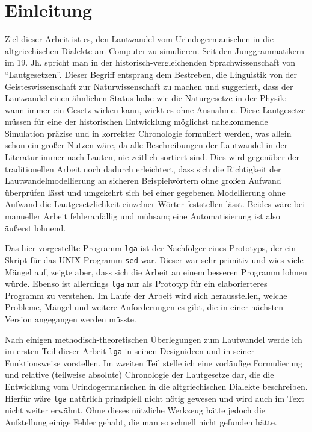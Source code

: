 \documentclass[12pt,a4paper,normalheadings,bibliography=totoc]{scrartcl}
\def\tt#1{\texttt{#1}}
\begin{document}
\newpage

\section{Einleitung}

Ziel dieser Arbeit ist es,
den Lautwandel vom Urindogermanischen in die altgriechischen Dialekte
am Computer zu simulieren.
Seit den Junggrammatikern im 19. Jh. spricht man
in der historisch-vergleichenden Sprachwissenschaft von ``Lautgesetzen''.
Dieser Begriff entsprang dem Bestreben,
die Linguistik von der Geisteswissenschaft zur Naturwissenschaft zu machen
und suggeriert, dass der Lautwandel
einen ähnlichen Status habe wie die Naturgesetze in der Physik:
wann immer ein Gesetz wirken kann, wirkt es ohne Ausnahme.
Diese Lautgesetze müssen für eine der historischen Entwicklung möglichst
nahekommende Simulation präzise und in korrekter Chronologie formuliert werden,
was allein schon ein großer Nutzen wäre,
da alle Beschreibungen der Lautwandel in der Literatur
immer nach Lauten, nie zeitlich sortiert sind.
Dies wird gegenüber der traditionellen Arbeit noch dadurch erleichtert,
dass sich die Richtigkeit der Lautwandelmodellierung
an sicheren Beispielwörtern ohne großen Aufwand überprüfen lässt
und umgekehrt sich bei einer gegebenen Modellierung
ohne Aufwand die Lautgesetzlichkeit einzelner Wörter feststellen lässt.
Beides wäre bei manueller Arbeit fehleranfällig und mühsam;
eine Automatisierung ist also äußerst lohnend.

Das hier vorgestellte Programm \tt{lga} ist
der Nachfolger eines Prototyps,
der ein Skript für das UNIX-Programm \tt{sed} war.
Dieser war sehr primitiv und wies viele Mängel auf,
zeigte aber,
dass sich die Arbeit an einem besseren Programm lohnen würde.
Ebenso ist allerdings \tt{lga} nur als Prototyp
für ein elaborierteres Programm zu verstehen.
Im Laufe der Arbeit wird sich herausstellen,
welche Probleme, Mängel und weitere Anforderungen es gibt,
die in einer nächsten Version angegangen werden müsste.

Nach einigen methodisch-theoretischen Überlegungen zum Lautwandel
werde ich im ersten Teil dieser Arbeit \tt{lga}
in seinen Designideen und in seiner Funktionsweise vorstellen.
Im zweiten Teil stelle ich eine vorläufige Formulierung und relative
(teilweise absolute) Chronologie der Lautgesetze dar,
die die Entwicklung vom Urindogermanischen in die altgriechischen Dialekte
beschreiben.
Hierfür wäre \tt{lga} natürlich prinzipiell nicht nötig gewesen
und wird auch im Text nicht weiter erwähnt.
Ohne dieses nützliche Werkzeug hätte jedoch
die Aufstellung einige Fehler gehabt,
die man so schnell nicht gefunden hätte.
\end{document}
